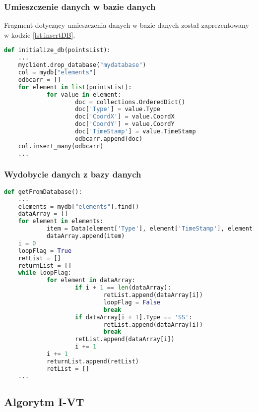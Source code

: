 \subsubsection{Umieszczenie danych w bazie danych}
Fragment dotyczący umieszczenia danych w bazie danych został zaprezentowany w kodzie \ref{lst:insertDB}. 
\begin{lstlisting}[language=Python, caption=Umieszczenie danych w bazie danych, label={lst:insertDB}]
def initialize_db(pointsList):
    ...
    myclient.drop_database("mydatabase")
    col = mydb["elements"]
    odbcarr = []
    for element in list(pointsList):
            for value in element:
                    doc = collections.OrderedDict()
                    doc['Type'] = value.Type
                    doc['CoordX'] = value.CoordX
                    doc['CoordY'] = value.CoordY
                    doc['TimeStamp'] = value.TimeStamp
                    odbcarr.append(doc)
    col.insert_many(odbcarr)
    ...
\end{lstlisting}
\subsubsection{Wydobycie danych z bazy danych}
\begin{lstlisting}[language=Python, caption=Wydobycie danych z bazy danych, label={lst:getFromDB}]
def getFromDatabase():
    ...
    elements = mydb["elements"].find()
    dataArray = []
    for element in elements:
            item = Data(element['Type'], element['TimeStamp'], element['CoordX'], element['CoordY'])
            dataArray.append(item)
    i = 0
    loopFlag = True
    retList = []
    returnList = []
    while loopFlag:
            for element in dataArray:
                    if i + 1 == len(dataArray):
                            retList.append(dataArray[i])
                            loopFlag = False
                            break
                    if dataArray[i + 1].Type == 'SS':
                            retList.append(dataArray[i])
                            break
                    retList.append(dataArray[i])
                    i += 1
            i += 1
            returnList.append(retList)
            retList = []
    ...
    \end{lstlisting}
\subsection{Algorytm I-VT}
